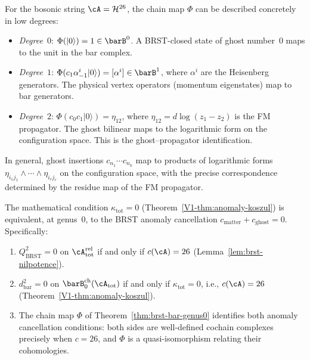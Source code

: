 \begin{remark}\label{rem:brst-bar-explicit}
For the bosonic string $\cA = \mathcal{H}^{26}$, the chain map
$\Phi$ can be described concretely in low degrees:
\begin{itemize}
\item \emph{Degree~$0$}: $\Phi(|0\rangle) = 1 \in \barB^0$.
 A BRST-closed state of ghost number~$0$ maps to the unit in
 the bar complex.
\item \emph{Degree~$1$}: $\Phi(c_1 \alpha_{-1}^i |0\rangle)
 = [\alpha^i] \in \barB^1$, where $\alpha^i$ are the Heisenberg
 generators. The physical vertex operators (momentum eigenstates)
 map to bar generators.
\item \emph{Degree~$2$}: $\Phi(c_0 c_1 |0\rangle) = \eta_{12}$,
 where $\eta_{12} = d\log(z_1 - z_2)$ is the FM propagator.
 The ghost bilinear maps to the logarithmic form on the
 configuration space. This is the ghost--propagator identification.
\end{itemize}
In general, ghost insertions $c_{n_1} \cdots c_{n_k}$ map to
products of logarithmic forms $\eta_{i_1 j_1} \wedge \cdots \wedge
\eta_{i_r j_r}$ on the configuration space, with the precise
correspondence determined by the residue map of the FM propagator.
\end{remark}

\begin{corollary}
\label{cor:anomaly-physical-genus0}
The mathematical condition $\kappa_{\mathrm{tot}} = 0$
\textup{(}Theorem~\textup{\ref{V1-thm:anomaly-koszul})} is equivalent,
at genus~$0$, to the BRST anomaly cancellation
$c_{\mathrm{matter}} + c_{\mathrm{ghost}} = 0$. Specifically:
\begin{enumerate}[label=\textup{(\roman*)}]
\item $Q_{\mathrm{BRST}}^2 = 0$ on $\cA_{\mathrm{tot}}^{\mathrm{rel}}$
 if and only if $c(\cA) = 26$ \textup{(}Lemma~\textup{\ref{lem:brst-nilpotence})}.
\item $d_{\mathrm{bar}}^2 = 0$ on $\barB^{\mathrm{ch}}_0(\cA_{\mathrm{tot}})$
 if and only if $\kappa_{\mathrm{tot}} = 0$, i.e., $c(\cA) = 26$
 \textup{(}Theorem~\textup{\ref{V1-thm:anomaly-koszul})}.
\item The chain map $\Phi$ of Theorem~\textup{\ref{thm:brst-bar-genus0}}
 identifies both anomaly cancellation conditions: both sides are well-defined
 cochain complexes precisely when $c = 26$, and $\Phi$ is a quasi-isomorphism
 relating their cohomologies.
\end{enumerate}
\end{corollary}

